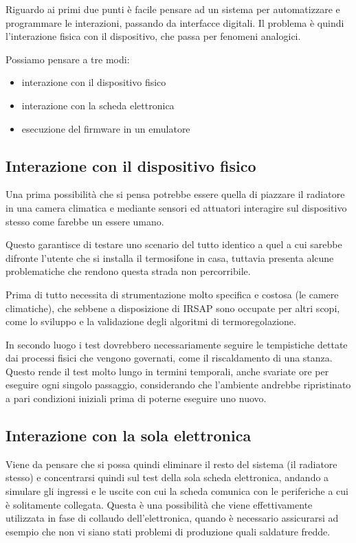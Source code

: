 \documentclass[12pt,a4paper,twoside,titlepage]{book}
\begin{document}
Riguardo ai primi due punti è facile pensare ad un sistema per automatizzare e programmare
le interazioni, passando da interfacce digitali. Il problema è quindi l'interazione fisica
con il dispositivo, che passa per fenomeni analogici.

Possiamo pensare a tre modi:

\begin{itemize}
    \item interazione con il dispositivo fisico
    \item interazione con la scheda elettronica
    \item esecuzione del \gls{firmware} in un emulatore
\end{itemize}

\subsection{Interazione con il dispositivo fisico}

Una prima possibilità che si pensa potrebbe essere quella di piazzare il radiatore in una camera
climatica e mediante sensori ed attuatori interagire sul dispositivo stesso come farebbe
un essere umano.

Questo garantisce di testare uno scenario del tutto identico a quel a cui sarebbe
difronte l'utente che si installa il termosifone in casa, tuttavia presenta alcune
problematiche che rendono questa strada non percorribile.

Prima di tutto necessita di strumentazione molto specifica e costosa (le camere climatiche),
che sebbene a disposizione di IRSAP sono occupate per altri scopi, come lo sviluppo e
la validazione degli algoritmi di termoregolazione.

In secondo luogo i test dovrebbero necessariamente seguire le tempistiche dettate dai processi
fisici che vengono governati, come il riscaldamento di una stanza.
Questo rende il test molto lungo in termini temporali, anche svariate ore per eseguire ogni singolo
passaggio, considerando che l'ambiente andrebbe ripristinato a pari condizioni iniziali prima
di poterne eseguire uno nuovo.

\subsection{Interazione con la sola elettronica}

Viene da pensare che si possa quindi eliminare il resto del sistema (il radiatore
stesso) e concentrarsi quindi sul test della sola scheda elettronica, andando a
simulare gli ingressi e le uscite con cui la scheda comunica con le periferiche
a cui è solitamente collegata. Questa è una possibilità che viene effettivamente
utilizzata in fase di collaudo dell'elettronica, quando è necessario assicurarsi ad
esempio che non vi siano stati problemi di produzione quali saldature fredde.
\end{document}
